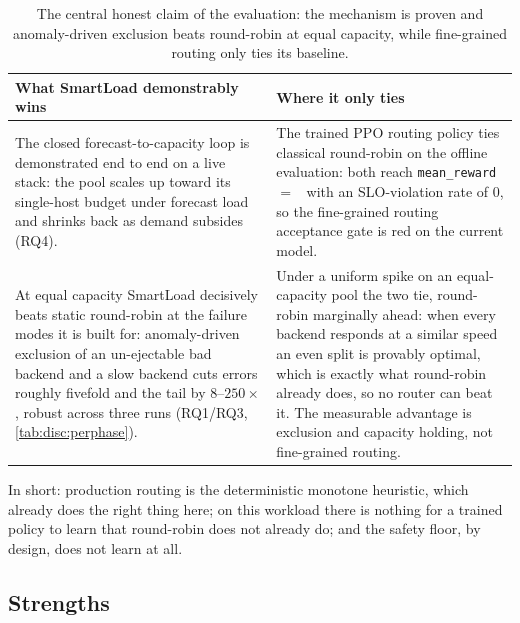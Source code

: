 \begin{table}[H]
  \centering
  \caption[The central honest claim of the evaluation]{The central honest claim of the evaluation: the mechanism is proven and anomaly-driven exclusion beats round-robin at equal capacity, while fine-grained routing only ties its baseline.}
  \label{box:disc:mechanism}
  \small
  \begin{tabularx}{\linewidth}{@{}p{4.6cm}Y@{}}
    \toprule
    \headrow
    \textbf{What SmartLoad demonstrably wins} & \textbf{Where it only ties} \\
    \midrule
    The closed forecast-to-capacity loop is demonstrated end to end on a live
      stack: the pool scales up toward its single-host budget under forecast load
      and shrinks back as demand subsides (RQ4).
      & The trained PPO routing policy ties classical round-robin on the offline
        evaluation: both reach \texttt{mean\_reward} $=$~\BMrlPpoReward{} with an
        SLO-violation rate of $0$, so the fine-grained routing acceptance gate is red
        on the current model. \\[3pt]
    At equal capacity SmartLoad decisively beats static round-robin at the failure
      modes it is built for: anomaly-driven exclusion of an un-ejectable bad backend
      and a slow backend cuts errors roughly fivefold and the tail by $8$--$250\times$,
      robust across three runs (RQ1/RQ3, \cref{tab:disc:perphase}).
      & Under a uniform spike on an equal-capacity pool the two tie, round-robin
        marginally ahead: when every backend responds at a similar speed an even split
        is provably optimal, which is exactly what round-robin already does, so no
        router can beat it. The measurable advantage is exclusion and capacity holding,
        not fine-grained routing. \\
    \bottomrule
  \end{tabularx}
\end{table}

In short: production routing is the deterministic monotone heuristic, which already
does the right thing here; on this workload there is nothing for a trained policy to
learn that round-robin does not already do; and the safety floor, by design, does not
learn at all.

\subsection{Strengths}
\label{disc:strengths}

